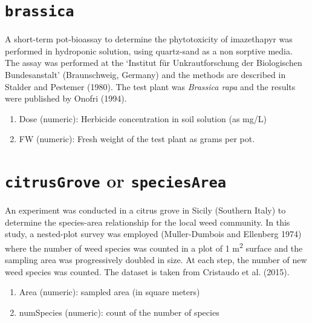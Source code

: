 \documentclass[
  letterpaper,
  DIV=11,
  numbers=noendperiod]{scrreprt}
\providecommand{\tightlist}{%
  \setlength{\itemsep}{0pt}\setlength{\parskip}{0pt}}
\begin{document}
\section*{\texorpdfstring{\texttt{brassica}}{brassica}}\label{brassica}


A short-term pot-bioassay to determine the phytotoxicity of imazethapyr
was performed in hydroponic solution, using quartz-sand as a non
sorptive media. The assay was performed at the `Institut für
Unkrautforschung der Biologischen Bundesanstalt' (Braunschweig, Germany)
and the methods are described in Stalder and Pestemer (1980). The test
plant was \emph{Brassica rapa} and the results were published by Onofri
(1994).

\begin{enumerate}
\def\labelenumi{\arabic{enumi}.}
\tightlist
\item
  Dose (numeric): Herbicide concentration in soil solution (as mg/L)
\item
  FW (numeric): Fresh weight of the test plant as grams per pot.
\end{enumerate}

\section*{\texorpdfstring{\texttt{citrusGrove} or
\texttt{speciesArea}}{citrusGrove or speciesArea}}\label{citrusgrove-or-speciesarea}


An experiment was conducted in a citrus grove in Sicily (Southern Italy)
to determine the species-area relationship for the local weed community.
In this study, a nested-plot survey was employed (Muller-Dumbois and
Ellenberg 1974) where the number of weed species was counted in a plot
of 1 m\textsuperscript{2} surface and the sampling area was
progressively doubled in size. At each step, the number of new weed
species was counted. The dataset is taken from Cristaudo et al. (2015).

\begin{enumerate}
\def\labelenumi{\arabic{enumi}.}
\tightlist
\item
  Area (numeric): sampled area (in square meters)
\item
  numSpecies (numeric): count of the number of species
\end{enumerate}
\end{document}
